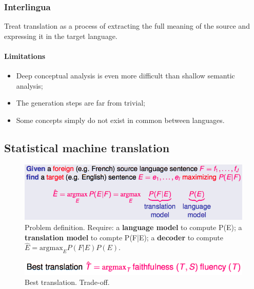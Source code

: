 \subsubsection{Interlingua}

Treat translation as a process of extracting the full meaning of the source and expressing it in the target language.

\paragraph{Limitations}
\begin{itemize}
	\item Deep conceptual analysis is even more difficult than shallow semantic analysis;
	\item The generation steps are far from trivial;
	\item Some concepts simply do not exist in common between languages.
\end{itemize}

\subsection{Statistical machine translation}

\begin{figure}[htp]
	\centering
	\includegraphics[scale=0.4]{images/59_def.png}
 	\caption{Problem definition. Require: a \textbf{language model} to compute P(E); a \textbf{translation model} to compte P(F|E); a \textbf{decoder} to compute $\hat{E} = \text{argmax}_E P(F|E) P(E)$.}
\end{figure}
\begin{figure}[htp]
	\centering
	\includegraphics[scale=0.5]{images/60_best.png}
 	\caption{Best translation. Trade-off.}
\end{figure}

